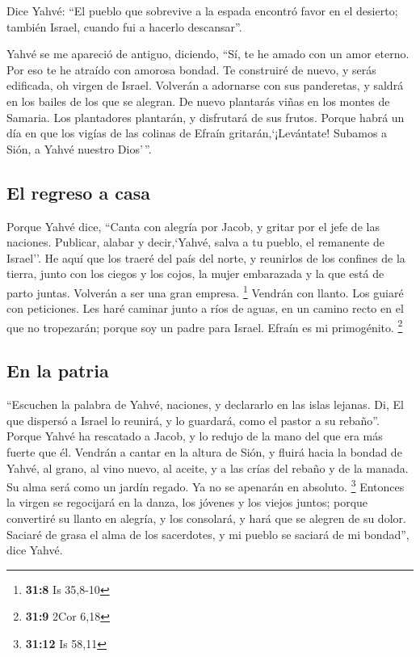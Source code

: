 \begin{paracol}{2}
 Dice Yahvé: ``El pueblo que sobrevive a la espada
encontró favor en el desierto; también Israel, cuando fui a hacerlo
descansar''.

 Yahvé se me apareció de antiguo, diciendo, ``Sí, te he
amado con un amor eterno. Por eso te he atraído con amorosa bondad.
 Te construiré de nuevo, y serás edificada, oh virgen de
Israel. Volverán a adornarse con sus panderetas, y saldrá en los bailes
de los que se alegran.  De nuevo plantarás viñas en los
montes de Samaria. Los plantadores plantarán, y disfrutará de sus
frutos.  Porque habrá un día en que los vigías de las
colinas de Efraín gritarán,`¡Levántate! Subamos a Sión, a Yahvé nuestro
Dios'\,''.

\hypertarget{el-regreso-a-casa}{%
\subsection{El regreso a casa}\label{el-regreso-a-casa}}

 Porque Yahvé dice, ``Canta con alegría por Jacob, y
gritar por el jefe de las naciones. Publicar, alabar y decir,`Yahvé,
salva a tu pueblo, el remanente de Israel''.  He aquí que
los traeré del país del norte, y reunirlos de los confines de la tierra,
junto con los ciegos y los cojos, la mujer embarazada y la que está de
parto juntas. Volverán a ser una gran empresa. \footnote{\textbf{31:8}
  Is 35,8-10}  Vendrán con llanto. Los guiaré con
peticiones. Les haré caminar junto a ríos de aguas, en un camino recto
en el que no tropezarán; porque soy un padre para Israel. Efraín es mi
primogénito. \footnote{\textbf{31:9} 2Cor 6,18}

\hypertarget{en-la-patria}{%
\subsection{En la patria}\label{en-la-patria}}

 ``Escuchen la palabra de Yahvé, naciones, y declararlo
en las islas lejanas. Di, El que dispersó a Israel lo reunirá, y lo
guardará, como el pastor a su rebaño''.  Porque Yahvé ha
rescatado a Jacob, y lo redujo de la mano del que era más fuerte que él.
 Vendrán a cantar en la altura de Sión, y fluirá hacia la
bondad de Yahvé, al grano, al vino nuevo, al aceite, y a las crías del
rebaño y de la manada. Su alma será como un jardín regado. Ya no se
apenarán en absoluto. \footnote{\textbf{31:12} Is 58,11} 
Entonces la virgen se regocijará en la danza, los jóvenes y los viejos
juntos; porque convertiré su llanto en alegría, y los consolará, y hará
que se alegren de su dolor.  Saciaré de grasa el alma de
los sacerdotes, y mi pueblo se saciará de mi bondad'', dice Yahvé.


\end{paracol}
